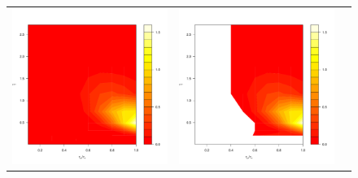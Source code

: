 \documentclass[10pt]{article}
\begin{document}
\begin{enumerate}
\begin{figure}
  \centering
  \begin{tabular}{ccc}
    \begin{minipage}{0.33\textwidth}
      \includegraphics[width=1\linewidth]{small-sigma-analytic.pdf}
    \end{minipage}
    &
      \begin{minipage}{0.33\textwidth}
      \includegraphics[width=1\linewidth]{small-sigma-Galerkin-no-filter.pdf}

\end{minipage}
\end{tabular}
\end{figure}
\end{enumerate}
\end{document}
